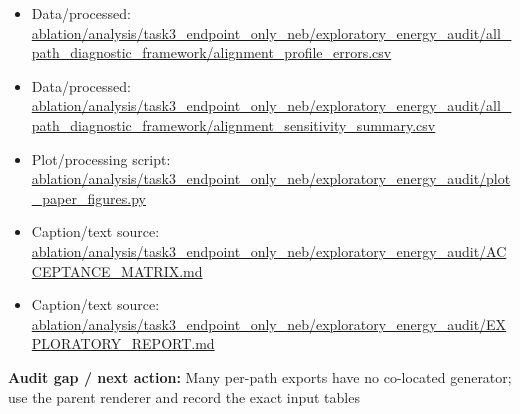 \documentclass[10pt]{article}
\newcommand{\statusline}[1]{\colorbox{gray!12}{\parbox{0.96\linewidth}{#1}}}
\begin{document}
\begin{itemize}[leftmargin=1.4em,noitemsep]
\item Data/processed: \begingroup\scriptsize\url{ablation/analysis/task3_endpoint_only_neb/exploratory_energy_audit/all_path_diagnostic_framework/alignment_profile_errors.csv}\endgroup
\item Data/processed: \begingroup\scriptsize\url{ablation/analysis/task3_endpoint_only_neb/exploratory_energy_audit/all_path_diagnostic_framework/alignment_sensitivity_summary.csv}\endgroup
\item Plot/processing script: \begingroup\scriptsize\url{ablation/analysis/task3_endpoint_only_neb/exploratory_energy_audit/plot_paper_figures.py}\endgroup
\item Caption/text source: \begingroup\scriptsize\url{ablation/analysis/task3_endpoint_only_neb/exploratory_energy_audit/ACCEPTANCE_MATRIX.md}\endgroup
\item Caption/text source: \begingroup\scriptsize\url{ablation/analysis/task3_endpoint_only_neb/exploratory_energy_audit/EXPLORATORY_REPORT.md}\endgroup
\end{itemize}
\statusline{\textbf{Audit gap / next action:} Many per-path exports have no co-located generator; use the parent renderer and record the exact input tables}
\vfill
\clearpage
\end{document}
